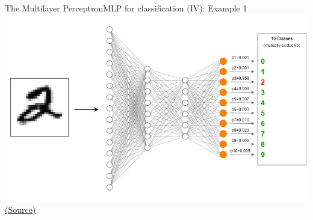 \documentclass[10pt,compress]{beamer} %
\begin{document}
\begin{frame}{The Multilayer Perceptron}{MLP for classification (IV): Example 1} 
    	\centering \includegraphics[width=0.8\paperheight]{figs/mlp-multiclass.jpg}\\
		\tiny \href{https://towardsdatascience.com/creating-a-multilayer-perceptron-mlp-classifier-model-to-identify-handwritten-digits-9bac1b16fe10}{(Source)}
\end{frame}
\end{document}
